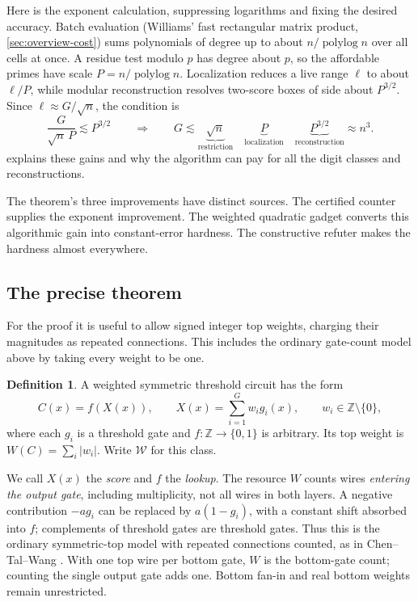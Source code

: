 \documentclass[11pt,letterpaper]{article}
\theoremstyle{definition}
\newtheorem{definition}[theorem]{Definition}
\theoremstyle{remark}
\newcommand{\Z}{\mathbb Z}
\newcommand{\cW}{\mathcal W}
\begin{document}
Here is the exponent calculation, suppressing logarithms and fixing
the desired accuracy. Batch evaluation (Williams' fast rectangular
matrix product, \cref{sec:overview-cost}) sums polynomials of degree up
to about \(n/\operatorname{polylog}n\) over all cells at once. A residue
test modulo \(p\) has degree about \(p\), so the affordable primes have
scale \(P=n/\operatorname{polylog}n\). Localization reduces a live range
\(\ell\) to about \(\ell/P\), while modular reconstruction resolves
two-score boxes of side about \(P^{3/2}\). Since
\(\ell\approx G/\sqrt n\), the condition is
\[
 \frac{G}{\sqrt n\,P}\lesssim P^{3/2}
 \qquad\Longrightarrow\qquad
 G\lesssim
 \underbrace{\sqrt n}_{\text{restriction}}\quad
 \underbrace{P}_{\text{localization}}\quad
 \underbrace{P^{3/2}}_{\text{reconstruction}}
 \approx n^3.
\]
 explains these gains and why the algorithm can
pay for all the digit classes and reconstructions.

The theorem's three improvements have distinct sources. The certified
counter supplies the exponent improvement. The weighted quadratic
gadget converts this algorithmic gain into constant-error hardness.
The constructive refuter makes the hardness almost everywhere.

\subsection{The precise theorem}\label{sec:main-results}

For the proof it is useful to allow signed integer top weights,
charging their magnitudes as repeated connections. This includes the
ordinary gate-count model above by taking every weight to be one.

\begin{definition}\label{def:class}
A weighted symmetric threshold circuit has the form
\[
 C(x)=f(X(x)),\qquad X(x)=\sum_{i=1}^G w_i g_i(x),
 \qquad w_i\in\Z\setminus\{0\},
\]
where each \(g_i\) is a threshold gate and \(f:\Z\to\{0,1\}\)
is arbitrary. Its top weight is \(W(C)=\sum_i|w_i|\).
Write \(\cW\) for this class.
\end{definition}

We call \(X(x)\) the \emph{score} and \(f\) the \emph{lookup}.
The resource \(W\) counts wires \emph{entering the output gate},
including multiplicity, not all wires in both layers. A negative
contribution \(-a g_i\) can be replaced by \(a(1-g_i)\), with a
constant shift absorbed into \(f\); complements of threshold gates
are threshold gates. Thus this is the ordinary symmetric-top model
with repeated connections counted, as in Chen--Tal--Wang
\cite[Section~5.3]{CTW26}. With one top wire per bottom gate, \(W\)
is the bottom-gate count; counting the single output gate adds one.
Bottom fan-in and real bottom weights remain unrestricted.
\end{document}
